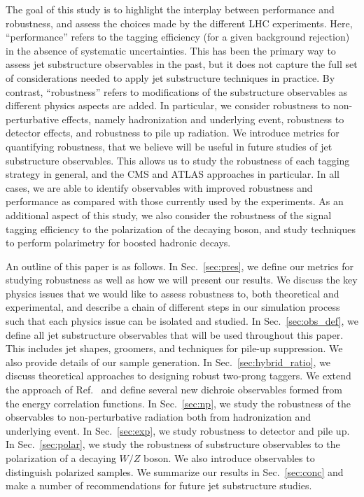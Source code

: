 \documentclass[11pt,letterpaper]{article}
\DeclareRobustCommand{\Sec}[1]{Sec.~\ref{#1}}
\DeclareRobustCommand{\Ref}[1]{Ref.~\cite{#1}}
\begin{document}
The goal of this study is to highlight the interplay between performance and robustness, and assess the choices made by the different LHC experiments.
%
Here, ``performance'' refers to the tagging efficiency (for a given background rejection) in the absence of systematic uncertainties.
%
This has been the primary way to assess jet substructure observables in the past, but it does not capture the full set of considerations needed to apply jet substructure techniques in practice.
%
By contrast, ``robustness'' refers to modifications of the substructure observables as different physics aspects are added.
%
In particular, we consider robustness to non-perturbative effects, namely hadronization and underlying event, robustness to detector effects, and robustness to pile up radiation.
%
We introduce metrics for quantifying robustness, that we believe will be useful in future studies of jet substructure observables.
%
This allows us to study the robustness of each tagging strategy in general, and the CMS and ATLAS approaches in particular.
%
In all cases, we are able to identify observables with improved robustness and performance as compared with those currently used by the experiments.
%
%
As an additional aspect of this study, we also consider the robustness of the signal tagging efficiency to the polarization of the decaying boson, and study techniques to perform polarimetry for boosted hadronic decays. 







An outline of this paper is as follows.
%
In \Sec{sec:pres}, we define our metrics for studying robustness as well as how we will present our results.
%
We discuss the key physics issues that we would like to assess robustness to, both theoretical and experimental, and describe a chain of different steps in our simulation process such that each physics issue can be isolated and studied.
%
In \Sec{sec:obs_def}, we define all jet substructure observables that will be used throughout this paper.
%
This includes jet shapes, groomers, and techniques for pile-up suppression. We also provide details of our sample generation.
%
In \Sec{sec:hybrid_ratio}, we discuss theoretical approaches to designing robust two-prong taggers.
%
We extend the approach of \Ref{Salam:2016yht} and define several new dichroic observables formed from the energy correlation functions.  
%
In \Sec{sec:np}, we study the robustness of the observables to non-perturbative radiation both from hadronization and underlying event.
%
In \Sec{sec:exp}, we study robustness to detector and pile up.
%
In \Sec{sec:polar}, we study the robustness of substructure observables to the polarization of a decaying $W/Z$ boson.
%
We also introduce observables to distinguish polarized samples.
%
We summarize our results in \Sec{sec:conc} and make a number of recommendations for future jet substructure studies.
\end{document}
